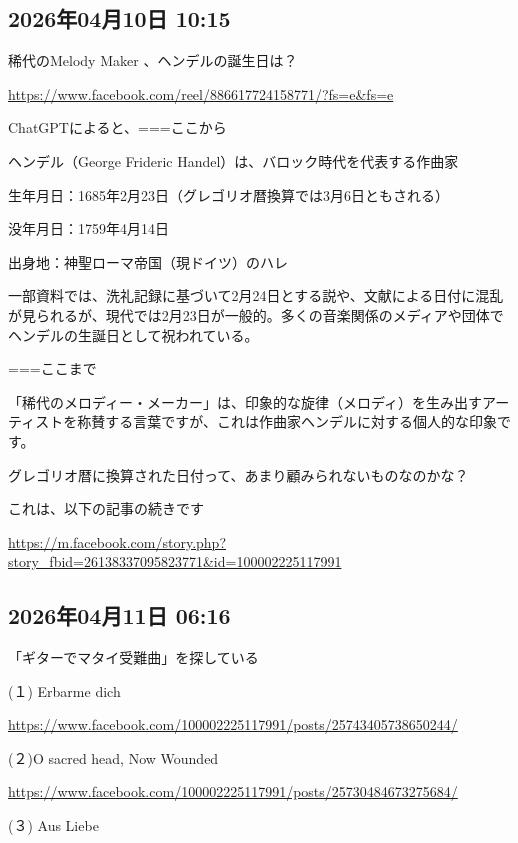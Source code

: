 \documentclass[facebook_diary.tex]{subfiles}
\begin{document}
\subsection*{2026年04月10日 10:15}

稀代のMelody Maker 、ヘンデルの誕生日は？


\url{https://www.facebook.com/reel/886617724158771/?fs=e&fs=e}




ChatGPTによると、===ここから


ヘンデル（George Frideric Handel）は、バロック時代を代表する作曲家

生年月日：1685年2月23日（グレゴリオ暦換算では3月6日ともされる）

没年月日：1759年4月14日

出身地：神聖ローマ帝国（現ドイツ）のハレ


一部資料では、洗礼記録に基づいて2月24日とする説や、文献による日付に混乱が見られるが、現代では2月23日が一般的。多くの音楽関係のメディアや団体でヘンデルの生誕日として祝われている。


===ここまで


「稀代のメロディー・メーカー」は、印象的な旋律（メロディ）を生み出すアーティストを称賛する言葉ですが、これは作曲家ヘンデルに対する個人的な印象です。


グレゴリオ暦に換算された日付って、あまり顧みられないものなのかな？


これは、以下の記事の続きです

\url{https://m.facebook.com/story.php?story_fbid=26138337095823771&id=100002225117991}



\subsection*{2026年04月11日 06:16}

「ギターでマタイ受難曲」を探している


(１) Erbarme dich

\url{https://www.facebook.com/100002225117991/posts/25743405738650244/}




(２)O sacred head, Now Wounded

\url{https://www.facebook.com/100002225117991/posts/25730484673275684/}




(３) Aus Liebe
\end{document}
